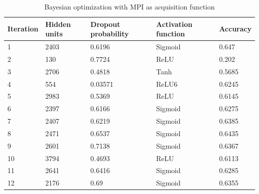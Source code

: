 \documentclass[12pt,fleqn]{article}
\begin{document}
\begin{table}[H]
	\caption{Bayesian optimization with MPI as acquisition function \label{MPI}}
	\centering
	\begin{tabular}{|l|l|l|l|l|}
		\hline
		Iteration & Hidden units & Dropout probability & Activation function & Accuracy \\ \hline
1 & 2403 & 0.6196 & Sigmoid & 0.647 \\ \hline 

2 & 130 & 0.7724 & ReLU & 0.202 \\ \hline 

3 & 2706 & 0.4818 & Tanh & 0.5685 \\ \hline 

4 & 554 & 0.03571 & ReLU6 & 0.6245 \\ \hline 

5 & 2983 & 0.5369 & ReLU & 0.6145 \\ \hline 

6 & 2397 & 0.6166 & Sigmoid & 0.6275 \\ \hline 

7 & 2407 & 0.6219 & Sigmoid & 0.6385 \\ \hline 

8 & 2471 & 0.6537 & Sigmoid & 0.6435 \\ \hline 

9 & 2601 & 0.7138 & Sigmoid & 0.6367 \\ \hline 

10 & 3794 & 0.4693 & ReLU & 0.6113 \\ \hline 

11 & 2641 & 0.6416 & Sigmoid & 0.6285 \\ \hline 

12 & 2176 & 0.69 & Sigmoid & 0.6355 \\ \hline 

	\end{tabular}
\end{table}
\end{document}
